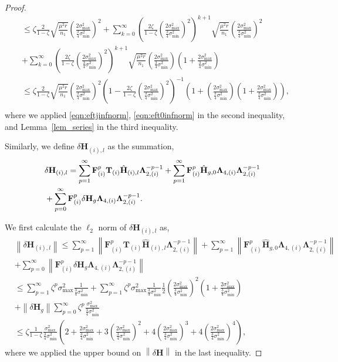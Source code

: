 \documentclass[twoside,11pt]{article}
\newcommand{\norm}[1]{\left\lVert#1\right\rVert}
\newcommand{\matF}{\mathbf{F}}
\newcommand{\hmatH}{{\hat{\mathbf{H}}}{}}
\newcommand{\matT}{\mathbf{T}}
\newcommand{\matLambda}{\mathbf{\Lambda}}
\newcommand{\dtmatH}{\delta\mathbf{H}}
\newcommand{\gop}{\sigma_{\max}}
\newcommand{\murnone}{\frac{\mu^2 r}{n_1}}
\newcommand{\sms}{\sigma_{\min}^2}
\newcommand{\tkappa}{\frac{2\gop^2}{\frac{3}{4}\sms}}
\newcommand{\brtkappa}{\left(\frac{2\gop^2}{\frac{3}{4}\sms}\right)}
\begin{document}
\begin{proof}
\begin{align*}
&\le \zeta\frac{2}{1-\zeta}\sqrt{\murnone}\left(\frac{2\gop^2}{\frac{3}{4}\sms}\right)^2+\sum_{k=0}^{\infty}\left(\frac{2\zeta}{1-\zeta}\left(\frac{2\gop^2}{\frac{3}{4}\sms}\right)^{2}\right)^{k+1}\sqrt{\murnone}\left(\frac{2\gop^2}{\frac{3}{4}\sms}\right)^{2}\\
&+\sum_{k=0}^{\infty}\left(\frac{2\zeta}{1-\zeta}\left(\frac{2\gop^2}{\frac{3}{4}\sms}\right)^{2}\right)^{k+1}\sqrt{\murnone}\left(\frac{2\gop^2}{\frac{3}{4}\sms}\right)\left(1+\frac{2\gop^2}{\frac{3}{4}\sms}\right)\\
&\le \zeta\frac{2}{1-\zeta}\sqrt{\murnone}\left(\frac{2\gop^2}{\frac{3}{4}\sms}\right)^2\left(1-\frac{2\zeta}{1-\zeta}\left(\frac{2\gop^2}{\frac{3}{4}\sms}\right)^{2}\right)^{-1}\left(1+\left(\frac{2\gop^2}{\frac{3}{4}\sms}\right)\left(1+\frac{2\gop^2}{\frac{3}{4}\sms}\right) \right),\\
\end{align*} 
where we applied \eqref{eqn:eftjinfnorm}, \eqref{eqn:eft0infnorm} in the second inequality, and Lemma~\ref{lem_series} in the third inequality.

Similarly, we define $\dtmatH_{(i),l}$ as the summation,
\begin{align*}
&\dtmatH_{(i),l}=\sum_{p=1}^{\infty}\matF_{(i)}^p\matT_{(i)}\hmatH_{(i),l}\matLambda_{2,(i)}^{-p-1}+\sum_{p=1}^{\infty}\matF_{(i)}^p\hmatH_{g,0}\matLambda_{4,(i)}\matLambda_{2,(i)}^{-p-1}\notag\\
&+\sum_{p=0}^{\infty}\matF_{(i)}^p\dtmatH_{g}\matLambda_{4,(i)}\matLambda_{2,(i)}^{-p-1}.\notag\\
\end{align*}

We first calculate the $\ell_2$ norm of $\dtmatH_{(i),l}$ as,
\begin{align*}
&\norm{\dtmatH_{(i),l}}\le\sum_{p=1}^\infty \norm{\matF_{(i)}^p\matT_{(i)}\hmatH_{(i),l}\matLambda_{2,(i)}^{-p-1} }+\sum_{p=1}^{\infty}\norm{\matF_{(i)}^p\hmatH_{g,0}\matLambda_{4,(i)}\matLambda_{2,(i)}^{-p-1}}\\
&+\sum_{p=0}^{\infty}\norm{\matF_{(i)}^p\dtmatH_{g}\matLambda_{4,(i)}\matLambda_{2,(i)}^{-p-1}}\\
&\le \sum_{p=1}^{\infty}\zeta^p\gop^2\frac{1}{\frac{3}{4}\sms}+\sum_{p=1}^{\infty}\zeta^p\gop^2\frac{1}{\frac{3}{4}\sms}\frac{1}{2}\brtkappa^2\left(1+\tkappa\right)\\
&+\norm{\dtmatH_g}\sum_{p=0}^{\infty}\zeta^p\frac{\gop^2}{\frac{3}{4}\sms}\\
&\le \zeta\frac{1}{1-\zeta}\frac{\gop^2}{\frac{3}{4}\sms}\left(2+\tkappa+3\brtkappa^2+4\brtkappa^3+4\brtkappa^4\right),
\end{align*}
where we applied the upper bound on $\norm{\dtmatH}$ in the last inequality.


\end{proof}
\end{document}
